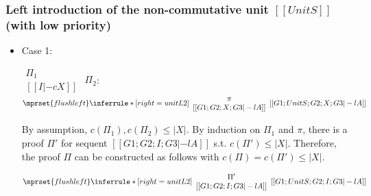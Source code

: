\subsubsection{Left introduction of the non-commutative unit $[[UnitS]]$ (with low priority)}
\begin{itemize}
\item Case 1:
      \begin{center}
        \scriptsize
        \begin{math}
          \begin{array}{c}
            \Pi_1 \\
            {[[I |-c X]]}
          \end{array}
        \end{math}
        \qquad\qquad
        $\Pi_2$:
        \begin{math}
          $$\mprset{flushleft}
          \inferrule* [right={\tiny unitL2}] {
            {
              \begin{array}{c}
                \pi \\
                {[[G1; G2; X; G3 |-l A]]}
              \end{array}
            }
          }{[[G1; UnitS; G2; X; G3 |-l A]]}
        \end{math}
      \end{center}
      By assumption, $c(\Pi_1),c(\Pi_2)\leq |X|$. By induction on $\Pi_1$
      and $\pi$, there is a proof $\Pi'$ for sequent
      $[[G1; G2; I; G3 |-l A]]$
      s.t. $c(\Pi') \leq |X|$. Therefore, the proof $\Pi$ can be
      constructed as follows with $c(\Pi) = c(\Pi') \leq |X|$.
      \begin{center}
        \scriptsize
        \begin{math}
          $$\mprset{flushleft}
          \inferrule* [right={\tiny unitL2}] {
            {
              \begin{array}{c}
                \Pi' \\
                {[[G1; G2; I; G3 |-l A]]}
              \end{array}
            }
          }{[[G1; UnitS; G2; I; G3 |-l A]]}
        \end{math}
      \end{center}


\end{itemize}
